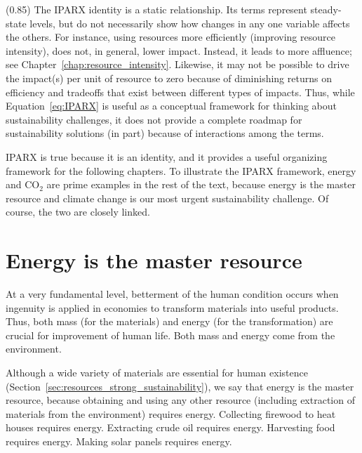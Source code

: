 \documentclass{article}\usepackage[]{graphicx}\usepackage[table]{xcolor}
\begin{document}
\begin{mcframe}[0.90\textwidth](0.85\textwidth)
The IPARX identity is a static relationship.
Its terms represent steady-state levels,
but do not necessarily show how changes in any one variable affects the others.
For instance, using resources more efficiently (improving resource intensity),
does not, in general, lower impact.
Instead, it leads to more affluence;
see Chapter~\ref{chap:resource_intensity}.
Likewise, it may not be possible to drive the impact(s) per unit of resource to
zero because of diminishing returns on efficiency
and tradeoffs that exist between different types of impacts.
Thus, while Equation~\ref{eq:IPARX} is useful as a conceptual framework for
thinking about sustainability challenges, it does not provide a complete
roadmap for sustainability solutions (in part) because of interactions among the terms.
\end{mcframe}

IPARX is true because it is an identity, and it provides a useful organizing framework
for the following chapters.
To illustrate the IPARX framework, energy and CO$_2$ are prime examples
in the rest of the text, because energy is the master resource
and climate change is our most urgent sustainability challenge.
Of course, the two are closely linked.


\section{Energy is the master resource}
\label{sec:masterE}

At a very fundamental level,
betterment of the human condition occurs when ingenuity is applied
in economies to transform materials into useful products.
Thus, both mass (for the materials) and energy (for the transformation)
are crucial for improvement of human life.
Both mass and energy come from the environment.

Although a wide variety of materials are essential for human existence
(Section~\ref{sec:resources_strong_sustainability}),
we say that energy is the master resource, because
obtaining and using any other resource
(including extraction of materials from the environment)
requires energy.
Collecting firewood to heat houses requires energy.
Extracting crude oil requires energy.
Harvesting food requires energy.
Making solar panels requires energy.
\end{document}
